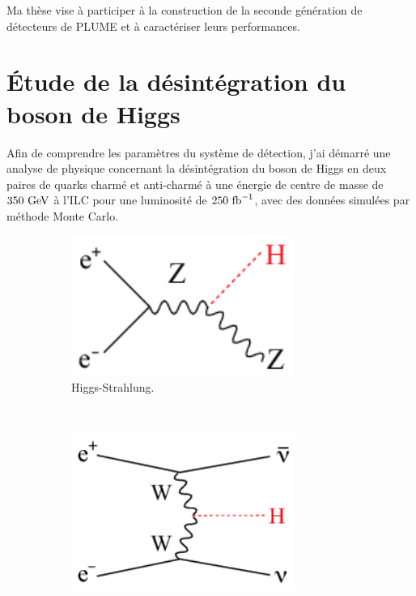   Ma thèse vise à participer à la construction de la seconde génération de détecteurs de PLUME et à caractériser leurs performances.

  \section{Étude de la désintégration du boson de Higgs}

  Afin de comprendre les paramètres du système de détection, j'ai démarré une analyse de physique concernant la désintégration du boson de Higgs en deux paires de quarks charmé et anti-charmé à une énergie de centre de masse de $350~\rm{GeV}$ à l'ILC pour une luminosité de $250~\rm{fb}^{-1}$, avec des données simulées par méthode Monte Carlo.

    \begin{figure}  
        \centering
        \begin{subfigure}[t]{0.3\textwidth}
            \includegraphics[width = 0.8\textwidth]{Pictures/Higgs/Chapter_Theory_figs_ZHdiagram.png}
            \caption{Higgs-Strahlung.}
            \label{fig:higgsStrahlung_resume}
        \end{subfigure}
        ~%
        \begin{subfigure}[t]{0.3\textwidth}
            \includegraphics[width = 0.8\textwidth]{Pictures/Higgs/Chapter_Theory_figs_nunuHdiagram.png}

\end{subfigure}
\end{figure}
